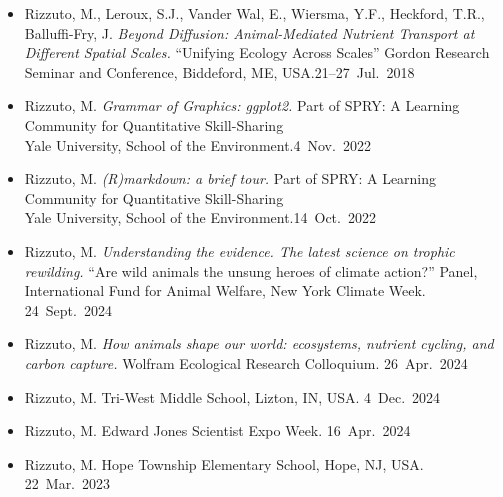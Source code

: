 
\begin{itemize}
  \item \textcolor{awesome}{Rizzuto, M.}, Leroux, S.J., Vander Wal, E., Wiersma, Y.F., Heckford, T.R., Balluffi-Fry, J. \emph{Beyond Diffusion: Animal-Mediated Nutrient Transport at Different Spatial Scales.} ``Unifying Ecology Across Scales'' Gordon Research Seminar and Conference, Biddeford, ME, USA.\hfill 21--27~Jul.~2018
\end{itemize}


\begin{itemize}
  \item \textcolor{awesome}{Rizzuto, M.} \emph{Grammar of Graphics: ggplot2.} Part of SPRY: A Learning Community for Quantitative Skill-Sharing\\ Yale University, School of the Environment.\hfill 4~Nov.~2022
  \item \textcolor{awesome}{Rizzuto, M.} \emph{(R)markdown: a brief tour.} Part of SPRY: A Learning Community for Quantitative Skill-Sharing\\ Yale University, School of the Environment.\hfill 14~Oct.~2022
\end{itemize}


\begin{itemize}
  \item \textcolor{awesome}{Rizzuto, M.} \emph{Understanding the evidence. The latest science on trophic rewilding.} ``Are wild animals the unsung heroes of climate action?'' Panel, International Fund for Animal Welfare, New York Climate Week. \hfill 24~Sept.~2024
\end{itemize}
\begin{itemize}
  \item \textcolor{awesome}{Rizzuto, M.} \emph{How animals shape our world: ecosystems, nutrient cycling, and carbon capture.} Wolfram Ecological Research Colloquium. \hfill 26~Apr.~2024
\end{itemize}


\begin{itemize}
  \item \textcolor{awesome}{Rizzuto, M.} Tri-West Middle School, Lizton, IN, USA. \hfill 4~Dec.~2024
  \item \textcolor{awesome}{Rizzuto, M.} Edward Jones Scientist Expo Week. \hfill 16~Apr.~2024
  \item \textcolor{awesome}{Rizzuto, M.} Hope Township Elementary School, Hope, NJ, USA. \hfill 22~Mar.~2023
\end{itemize}

